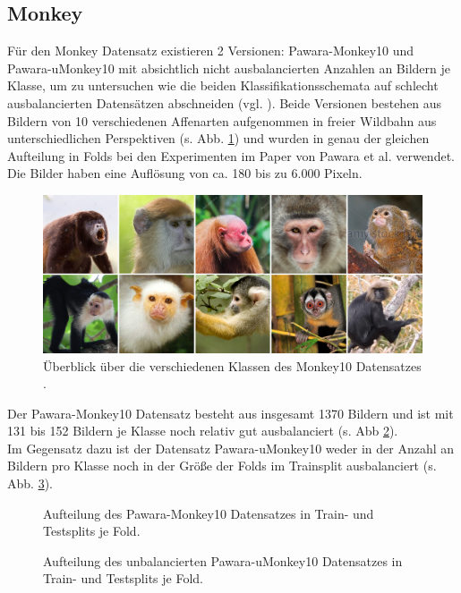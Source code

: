 \subsection{Monkey}
Für den Monkey Datensatz existieren 2 Versionen: Pawara-Monkey10 und Pawara-uMonkey10 mit absichtlich nicht ausbalancierten Anzahlen an Bildern je Klasse, um zu untersuchen wie die beiden Klassifikationsschemata auf schlecht ausbalancierten Datensätzen abschneiden (vgl. \cite{pawaraWebsiteDatensaetze}). Beide Versionen bestehen aus Bildern von 10 verschiedenen Affenarten aufgenommen in freier Wildbahn aus unterschiedlichen Perspektiven (s. Abb. \ref{fig:monkeyUeberblick}) und wurden in genau der gleichen Aufteilung in Folds bei den Experimenten im Paper von Pawara et al. \cite{pawaraPaper} verwendet.
Die Bilder haben eine Auflösung von ca. 180 bis zu 6.000 Pixeln.
\begin{figure}[H]
\centering
\includegraphics[scale=0.08]{img/2_monkey10-image.jpg}
\caption{Überblick über die verschiedenen Klassen des Monkey10 Datensatzes \cite{pawaraMonkey}.}
\label{fig:monkeyUeberblick}
\end{figure}

Der Pawara-Monkey10 Datensatz besteht aus insgesamt 1370 Bildern und ist mit 131 bis 152 Bildern je Klasse noch relativ gut ausbalanciert (s. Abb \ref{fig:Pawara-Monkey10Zusammensetzung}).\\

Im Gegensatz dazu ist der Datensatz Pawara-uMonkey10 weder in der Anzahl an Bildern pro Klasse noch in der Größe der Folds im Trainsplit ausbalanciert (s. Abb. \ref{fig:Pawara-uMonkey10Zusammensetzung}). 


\begin{figure}[H]
\begin{adjustbox}{width=1.2\textwidth, center}

\end{adjustbox}
\caption{Aufteilung des Pawara-Monkey10 Datensatzes \cite{pawaraWebsiteDatensaetze} in Train- und Testsplits je Fold.}
\label{fig:Pawara-Monkey10Zusammensetzung}
\end{figure}
\begin{figure}[H]
\begin{adjustbox}{width=1.2\textwidth, center}

\end{adjustbox}
\caption{Aufteilung des unbalancierten Pawara-uMonkey10 Datensatzes \cite{pawaraWebsiteDatensaetze} in Train- und Testsplits je Fold.}
\label{fig:Pawara-uMonkey10Zusammensetzung}
\end{figure}





